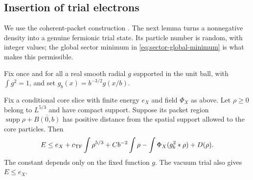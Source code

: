 \subsection{Insertion of trial electrons}

We use the coherent-packet construction
\citep[Lemma~8.2]{Solovej2003}. The next lemma turns a nonnegative
density into a genuine fermionic trial state.  Its particle number is random, with integer values;
the global sector minimum in \eqref{eq:sector-global-minimum} is what
makes this permissible.

Fix once and for all a real smooth radial $g$ supported in the unit
ball, with $\int g^2=1$, and set $g_b(x)=b^{-3/2}g(x/b)$.

\begin{lemma}
\label{lem:loc-hole-trial}
Fix a conditional core slice with finite energy $e_X$ and field
$\Phi_X$ as above.  Let $\rho\geq0$ belong to $L^{5/3}$ and have
compact support.  Suppose its packet region
$\operatorname{supp}\rho+\overline{B(0,b)}$ has positive distance
from the spatial support allowed to the core particles.  Then
\begin{equation}\label{eq:loc-trial}
 E\leq e_X+c_{\mathrm{TF}}\int\rho^{5/3}
       +Cb^{-2}\int\rho
       -\int\Phi_X(g_b^2*\rho)+D(\rho).
\end{equation}
The constant depends only on the fixed function $g$.  The vacuum
trial also gives $E\leq e_X$.
\end{lemma}


